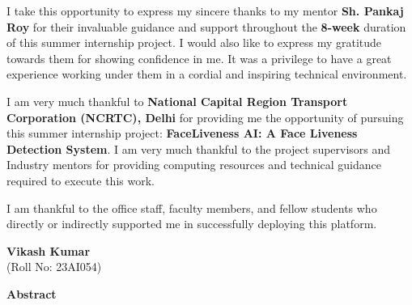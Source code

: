 \documentclass[12pt,a4paper,oneside]{article}
\begin{document}
\begin{doublespace}
I take this opportunity to express my sincere thanks to my mentor \textbf{Sh. Pankaj Roy} for their invaluable guidance and support throughout the \textbf{8-week} duration of this summer internship project. I would also like to express my gratitude towards them for showing confidence in me. It was a privilege to have a great experience working under them in a cordial and inspiring technical environment.

I am very much thankful to \textbf{National Capital Region Transport Corporation (NCRTC), Delhi} for providing me the opportunity of pursuing this summer internship project: \textbf{FaceLiveness AI: A Face Liveness Detection System}. I am very much thankful to the project supervisors and Industry mentors for providing computing resources and technical guidance required to execute this work.

I am thankful to the office staff, faculty members, and fellow students who directly or indirectly supported me in successfully deploying this platform.
\end{doublespace}

\vspace{2cm}
\begin{flushright}
\textbf{Vikash Kumar}\\
(Roll No: 23AI054)
\end{flushright}

\newpage

\vspace*{0.5cm}
\begin{center}
{\Large \textbf{Abstract}}
\end{center}
\vspace{0.8cm}
\end{document}
